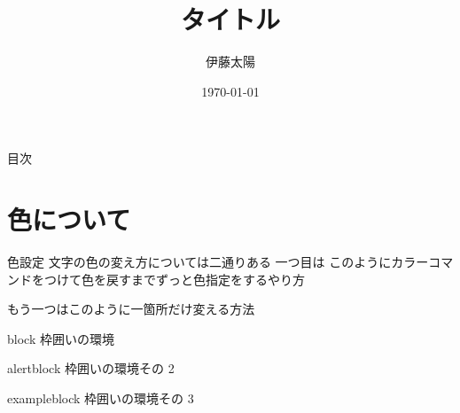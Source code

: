 \documentclass[aspectratio=169, dvipdfmx, 12pt,uplatex]{beamer} %
\title[]{タイトル}
\subtitle{}
\author[伊藤太陽]{伊藤太陽}
\institute[東京大学経済学部4年]{東京大学経済学部4年}
\date{\today}
\newcommand{\Aka}[1]{\textcolor{Akadaidai}{#1}}
\newcommand{\Nanohana}[1]{\textcolor{Nanohana}{#1}}
\begin{document}
\maketitle
\begin{frame}{目次}
    \tableofcontents
\end{frame}
\section{色について}
\begin{frame}[allowframebreaks]{色設定}
文字の色の変え方については二通りある
一つ目は
\color{Wasurena}
このようにカラーコマンドをつけて色を戻すまでずっと色指定をするやり方

もう一つは\Aka{このよう}に\Nanohana{一箇所}だけ変える方法


\begin{block}{block}
枠囲いの環境
\end{block}
\begin{alertblock}{alertblock}
枠囲いの環境その 2
\end{alertblock}
\begin{exampleblock}{exampleblock}
枠囲いの環境その 3
\end{exampleblock}
\end{frame}
\end{document}
